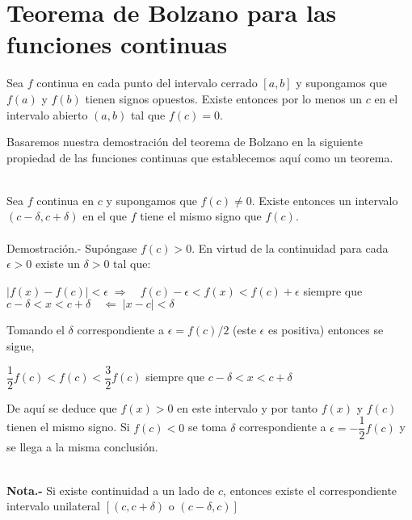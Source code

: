 \section{Teorema de Bolzano para las funciones continuas}

\begin{teo}
    Sea $f$ continua en cada punto del intervalo cerrado $[a,b]$ y supongamos que $f(a)$ y $f(b)$ tienen signos opuestos. Existe entonces por lo menos un $c$ en el intervalo abierto $(a,b)$ tal que $f(c)=0$.\\
\end{teo}

Basaremos nuestra demostración del teorema de Bolzano en la siguiente propiedad de las funciones continuas que establecemos aquí como un teorema.\\\\

\begin{teo}
    Sea $f$ continua en $c$ y supongamos que $f(c)\neq 0$. Existe entonces un intervalo $(c-\delta,c+\delta)$ en el que $f$ tiene el mismo signo que $f(c)$.\\\\
	Demostración.-\; Supóngase $f(c)>0$. En virtud de la continuidad para cada $\epsilon>0$ existe un $\delta>0$ tal que:
	\begin{center}
	$|f(x)-f(c)|<\epsilon \;\Rightarrow \quad  f(c)-\epsilon<f(x)<f(c)+\epsilon$ siempre que $c-\delta < x <c+\delta\quad \Leftarrow \; |x-c|<\delta$
	\end{center}
	Tomando el $\delta$ correspondiente a $\epsilon=f(c)/2$ (este $\epsilon$ es positiva) entonces se sigue,
	\begin{center}
	$\dfrac{1}{2}f(c)<f(c)<\dfrac{3}{2}f(c)$ siempre que $c-\delta < x <c+\delta$
	\end{center}
	De aquí se deduce que $f(x)>0$ en este intervalo y por tanto $f(x)$ y $f(c)$ tienen el mismo signo. Si $f(c)<0$ se toma $\delta$ correspondiente a $\epsilon=-\dfrac{1}{2}f(c)$ y se llega a la misma conclusión.\\\\
\end{teo}

\textbf{Nota.-} Si existe continuidad a un lado de $c$, entonces existe el correspondiente intervalo unilateral $[(c,c+\delta)\mbox{ o } (c-\delta,c)]$\\\\

